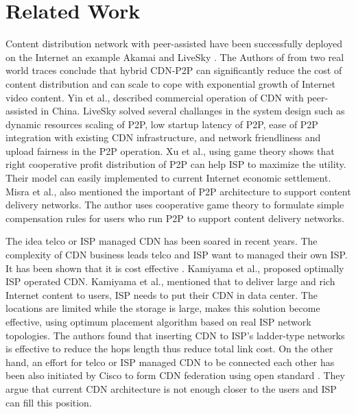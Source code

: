 \documentclass[paper]{ieice}
\begin{document}
\section{Related Work} 
Content distribution network with peer-assisted have been successfully deployed on the Internet an example Akamai \cite{Huang:2008:UHC:1496046.1496064} and LiveSky \cite{Yin:2010:LEC:1823746.1823750}.
The Authors of \cite{Huang:2008:UHC:1496046.1496064} from two real world traces conclude that hybrid CDN-P2P can significantly reduce the cost of content distribution and can scale to cope with exponential growth of Internet video content.
Yin et al., \cite{Yin:2010:LEC:1823746.1823750} described commercial operation of CDN with peer-assisted in China.   
LiveSky solved several challanges in the system design such as dynamic resources scaling of P2P, low startup latency of P2P, ease of P2P integration with existing CDN infrastructure, and network friendliness and upload fairness in the P2P operation. 
Xu et al.,\cite{DBLP:journals/corr/abs-1212-4915} using game theory shows that right cooperative profit distribution of P2P can help ISP to maximize the utility. 
Their model can easily implemented to current Internet economic settlement.
Misra et al.,\cite{Misra:2010:IPS:1811099.1811064} also mentioned the important of P2P architecture to support content delivery networks. 
The author uses cooperative game theory to formulate simple compensation rules for users who run P2P to support content delivery networks.  

The idea telco or ISP managed CDN has been soared in recent years.  
The complexity of CDN business leads telco and ISP want to managed their own ISP.
It has been shown that it is cost effective \cite{federation}\cite{norton2011internet}. 
Kamiyama et al., \cite{NoriakiKAMIYAMA2013} proposed optimally ISP operated CDN. 
Kamiyama et al., mentioned that to deliver large and rich Internet content to users, ISP needs to put their CDN in data center.
The locations are limited while the storage is large, makes this solution become effective, using optimum placement algorithm based on real ISP network topologies.
The authors found that inserting CDN to ISP's ladder-type networks is effective to reduce the hops length thus reduce total link cost. 
On the other hand, an effort for telco or ISP managed CDN to be connected each other has been also initiated by Cisco to form CDN federation \cite{federation} using open standard \cite{cdni}.
They argue that current CDN architecture is not enough closer to the users and ISP can fill this position.   
\end{document}
